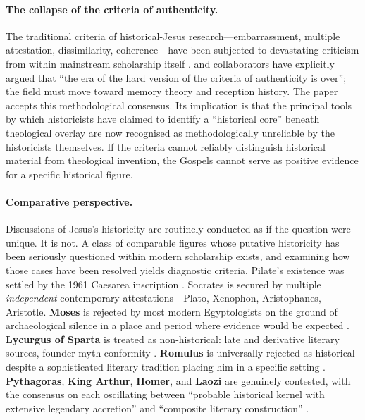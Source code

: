 \documentclass[12pt,oneside]{article}
\begin{document}
\paragraph{The collapse of the criteria of authenticity.}
The traditional criteria of historical-Jesus research---embarrassment,
multiple attestation, dissimilarity, coherence---have been
subjected to devastating criticism from within mainstream
scholarship itself \citep{Allison2010,Keith2024}.  \citet{Keith2024}
and collaborators have explicitly argued that \enquote{the era of
the hard version of the criteria of authenticity is over}; the field
must move toward memory theory and reception history.  The paper
accepts this methodological consensus.  Its implication is that the
principal tools by which historicists have claimed to identify a
\enquote{historical core} beneath theological overlay are now
recognised as methodologically unreliable by the historicists
themselves.  If the criteria cannot reliably distinguish historical
material from theological invention, the Gospels cannot serve as
positive evidence for a specific historical figure.

\paragraph{Comparative perspective.}
Discussions of Jesus's historicity are routinely conducted as if the
question were unique.  It is not.  A class of comparable figures
whose putative historicity has been seriously questioned within
modern scholarship exists, and examining how those cases have been
resolved yields diagnostic criteria.  Pilate's existence was
settled by the 1961 Caesarea inscription \citep{Vardaman1962}.
Socrates is secured by multiple \textit{independent} contemporary
attestations---Plato, Xenophon, Aristophanes, Aristotle.
\textbf{Moses} is rejected by most modern Egyptologists on the
ground of archaeological silence in a place and period where
evidence would be expected \citep{FinkelsteinSilberman2001,ThompsonTL1999}.
\textbf{Lycurgus of Sparta} is treated as non-historical: late and
derivative literary sources, founder-myth conformity
\citep{Cartledge2001}.  \textbf{Romulus} is universally rejected as
historical despite a sophisticated literary tradition placing him in
a specific setting \citep{Beard2015,Wiseman1995}.
\textbf{Pythagoras}, \textbf{King Arthur}, \textbf{Homer}, and
\textbf{Laozi} are genuinely contested, with the consensus on each
oscillating between \enquote{probable historical kernel with
extensive legendary accretion} and \enquote{composite literary
construction} \citep{Riedweg2005,Higham2002,WestML2011,GrahamA1986}.
\end{document}
